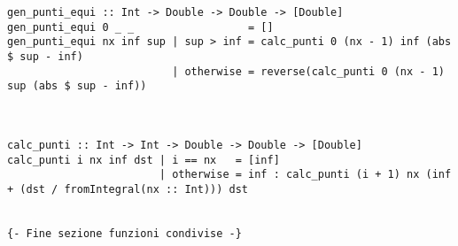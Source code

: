 \begin{verbatim}
gen_punti_equi :: Int -> Double -> Double -> [Double]
gen_punti_equi 0 _ _                  = []
gen_punti_equi nx inf sup | sup > inf = calc_punti 0 (nx - 1) inf (abs $ sup - inf) 
                          | otherwise = reverse(calc_punti 0 (nx - 1) sup (abs $ sup - inf))



calc_punti :: Int -> Int -> Double -> Double -> [Double]
calc_punti i nx inf dst | i == nx   = [inf]
                        | otherwise = inf : calc_punti (i + 1) nx (inf + (dst / fromIntegral(nx :: Int))) dst


{- Fine sezione funzioni condivise -}

\end{verbatim}